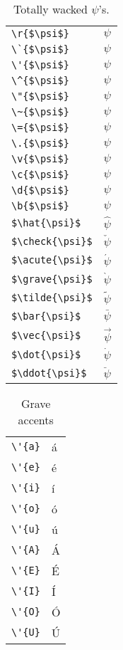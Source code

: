 \documentclass{article}
\begin{document}
\begin{table}
\begin{center}
\begin{tabular}{ll}
\verb#\r{$\psi$}#& \r{$\psi$}\\
\verb#\`{$\psi$}#& \`{$\psi$}\\
\verb#\'{$\psi$}#& \'{$\psi$}\\
\verb#\^{$\psi$}#& \^{$\psi$}\\
\verb#\"{$\psi$}#& \"{$\psi$}\\
\verb#\~{$\psi$}#& \~{$\psi$}\\
\verb#\={$\psi$}#& \={$\psi$}\\
\verb#\.{$\psi$}#& \.{$\psi$}\\
\verb#\v{$\psi$}#& \v{$\psi$}\\
\verb#\c{$\psi$}#& \c{$\psi$}\\
\verb#\d{$\psi$}#& \d{$\psi$}\\
\verb#\b{$\psi$}#& \b{$\psi$}\\
\verb#$\hat{\psi}$#& $\hat{\psi}$\\
\verb#$\check{\psi}$#& $\check{\psi}$\\
\verb#$\acute{\psi}$#& $\acute{\psi}$\\
\verb#$\grave{\psi}$#& $\grave{\psi}$\\
\verb#$\tilde{\psi}$#& $\tilde{\psi}$\\
\verb#$\bar{\psi}$#& $\bar{\psi}$\\
\verb#$\vec{\psi}$#& $\vec{\psi}$\\
\verb#$\dot{\psi}$#& $\dot{\psi}$\\
\verb#$\ddot{\psi}$#& $\ddot{\psi}$
\end{tabular}
\caption{Totally wacked $\psi$'s.}
\end{center}
\end{table}
\pagebreak

\begin{table}
\begin{center}
\begin{tabular}{ll}
\verb#\'{a}#& \'{a}\\
\verb#\'{e}#& \'{e}\\
\verb#\'{i}#& \'{i}\\
\verb#\'{o}#& \'{o}\\
\verb#\'{u}#& \'{u}\\
\verb#\'{A}#& \'{A}\\
\verb#\'{E}#& \'{E}\\
\verb#\'{I}#& \'{I}\\
\verb#\'{O}#& \'{O}\\
\verb#\'{U}#& \'{U}
\end{tabular}
\caption{Grave accents}
\end{center}
\end{table}
\end{document}
